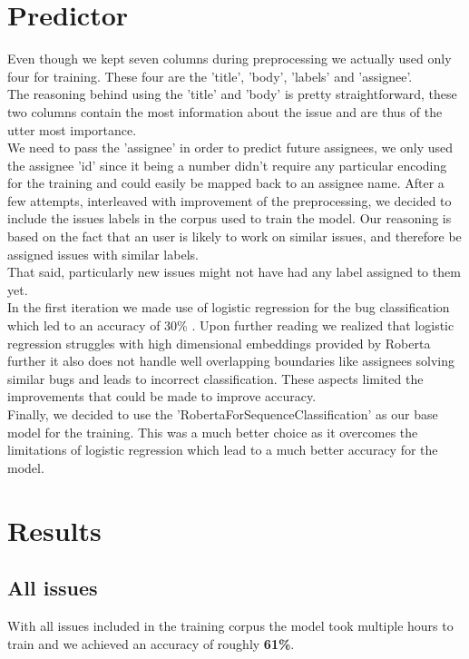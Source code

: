 \documentclass[tikz,10pt,fleqn]{article}
\begin{document}
\section*{Predictor}
Even though we kept seven columns during preprocessing we actually used only four for training. These four are the 'title', 'body', 'labels' and 'assignee'.\\
The reasoning behind using the 'title' and 'body' is pretty straightforward, these two columns contain the most information about the issue and are thus of the utter most importance. \\
We need to pass the 'assignee' in order to predict future assignees, we only used the assignee 'id' since it being a number didn't require any particular encoding for the training and could easily be mapped back to an assignee name.
After a few attempts, interleaved with improvement of the preprocessing, we decided to include the issues labels in the corpus used to train the model. Our reasoning is based on the fact that an user is likely to work on similar issues, and therefore be assigned issues with similar labels.\\
That said, particularly new issues might not have had any label assigned to them yet.\\
In the first iteration we made use of logistic regression for the bug classification which led to an accuracy of 30\% . Upon further reading we realized that logistic regression struggles with high dimensional embeddings provided by Roberta further it also does not handle well overlapping boundaries like assignees solving similar bugs and leads to incorrect classification. These aspects limited the improvements that could be made to improve accuracy.\\
Finally, we decided to use the 'RobertaForSequenceClassification' as our base model for the training. This was a much better choice as it overcomes the limitations of logistic regression which lead to a much better accuracy for the model.


\section*{Results}
\subsection*{All issues}
With all issues included in the training corpus the model took multiple hours to train and we achieved an accuracy of roughly \textbf{61\%}.
\end{document}
